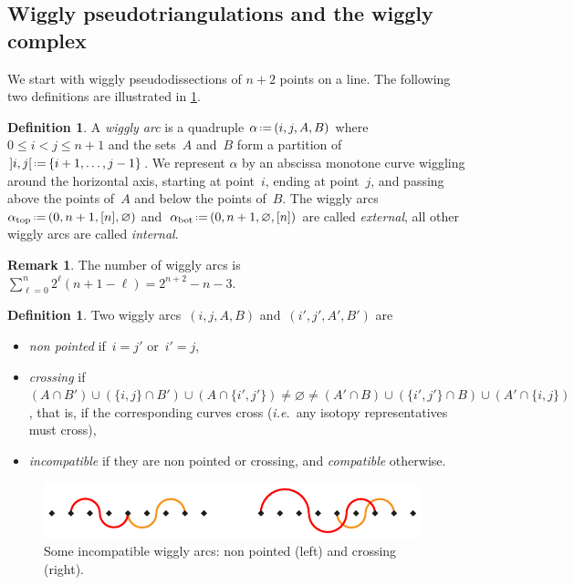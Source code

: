\documentclass{amsart}
\theoremstyle{definition}
\newtheorem{definition}[theorem]{Definition}
\newtheorem{remark}[theorem]{Remark}
\newcommand{\eqdef}{\mbox{\,\raisebox{0.2ex}{\scriptsize\ensuremath{\mathrm:}}\ensuremath{=}\,}} %
\newcommand{\ie}{\textit{i.e.}~} %
\newcommand{\darkblue}{\color{darkblue}} %
\newcommand{\defn}[1]{\textsl{\darkblue #1}} %
\begin{document}

\subsection{Wiggly pseudotriangulations and the wiggly complex}
\label{subsec:wigglyPseudotriangulations}

We start with wiggly pseudodissections of $n+2$ points on a line.
The following two definitions are illustrated in \cref{fig:incompatible}.

\begin{definition}
A \defn{wiggly arc} is a quadruple $\alpha \eqdef (i,j,A,B)$ where $0 \le i < j \le n+1$ and the sets~$A$ and~$B$ form a partition of~${]i,j[} \eqdef \{i+1, \dots, j-1\}$.
We represent $\alpha$ by an abscissa monotone curve wiggling around the horizontal axis, starting at point~$i$, ending at point~$j$, and passing above the points of~$A$ and below the points of~$B$.
The wiggly arcs~$\alpha_\mathrm{top} \eqdef (0, n+1, [n], \varnothing)$ and~${\alpha_\mathrm{bot} \eqdef (0, n+1, \varnothing, [n])}$ are called \defn{external}, all other wiggly arcs are called \defn{internal}.
\end{definition}

\begin{remark}
\label{rem:numberWigglyArcs}
The number of wiggly arcs is~$\sum_{\ell = 0}^n 2^\ell (n+1-\ell) = 2^{n+2}-n-3$.
\end{remark}

\begin{definition}
\label{def:compatible}
Two wiggly arcs~$(i,j,A,B)$ and~$(i',j',A',B')$ are 
\begin{itemize}
\item \defn{non pointed} if~$i = j'$ or~$i' = j$,
\item \defn{crossing} if~$(A \cap B') \cup (\{i,j\} \cap B') \cup (A \cap \{i',j'\}) \ne \varnothing \ne (A' \cap B) \cup (\{i',j'\} \cap B) \cup (A' \cap \{i,j\})$, that is, if the corresponding curves cross (\ie any isotopy representatives must cross),
\item \defn{incompatible} if they are non pointed or crossing, and \defn{compatible} otherwise.
\end{itemize}
%
\begin{figure}[b]
\centerline{\includegraphics[scale=1.3]{incompatible}}
\caption{Some incompatible wiggly arcs: non pointed (left) and crossing (right).}
\label{fig:incompatible}
\end{figure}
\end{definition}
\end{document}

